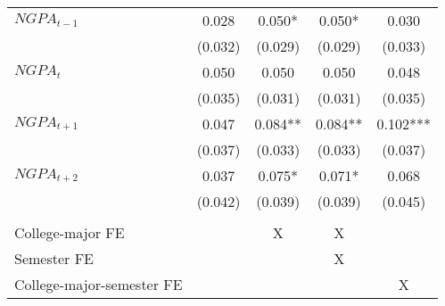 {{\begin{tabular}{lccc|>{\columncolor[gray]{0.8}}c}
\hspace{3mm}$NGPA_{t-1}$            &       0.028   &       0.050*  &       0.050*  &       0.030   \\
                    &     (0.032)   &     (0.029)   &     (0.029)   &     (0.033)   \\
 
\hspace{3mm}$NGPA_{t}$              &       0.050   &       0.050   &       0.050   &       0.048   \\
                    &     (0.035)   &     (0.031)   &     (0.031)   &     (0.035)   \\
 
\hspace{3mm}$NGPA_{t+1}$            &       0.047   &       0.084** &       0.084** &       0.102***\\
                    &     (0.037)   &     (0.033)   &     (0.033)   &     (0.037)   \\
 
\hspace{3mm}$NGPA_{t+2}$            &       0.037   &       0.075*  &       0.071*  &       0.068   \\
                    &     (0.042)   &     (0.039)   &     (0.039)   &     (0.045)   \\
&  &  &  &   \\  \hline 
 College-major FE                       &  & X   & X &   \\
 Semester FE                            &  &     & X &   \\
 College-major-semester FE              &  &     &   & X \\

\bottomrule
\end{tabular}
}
}
